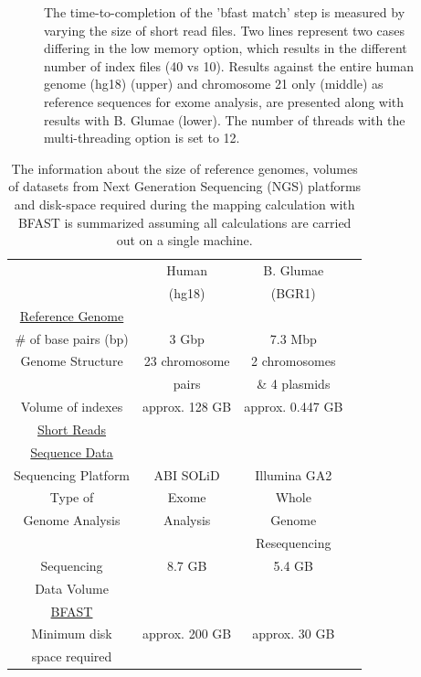 \documentclass{sig-alternate}
\begin{document}
\begin{figure}

\caption{\small The time-to-completion of the 'bfast match' step is
  measured by varying the size of short read files.  Two lines
  represent two cases differing in the low memory option, which
  results in the different number of index files (40 vs 10).  Results against the entire human genome (hg18) (upper) and chromosome 21 only (middle) as reference sequences for exome analysis, are presented along with results with B. Glumae (lower).  The number of threads with the multi-threading option is set to 12.}
  \label{fig:parallel-execution} 
 \end{figure}




\begin{table}
\small
\begin{tabular}{|c|c|c|c|} 
  \hline 
   & Human & B. Glumae   \\ 
& (hg18) & (BGR1)\\   
   
   \hline \hline
 \underline{Reference Genome} & &  \\
    \# of base pairs (bp) &  3 Gbp & 7.3 Mbp \\ \hline
   Genome Structure &   23 chromosome  & 2 chromosomes  \\  
   &   pairs & \& 4 plasmids \\ \hline
    Volume of indexes  & approx. 128 GB  & approx. 0.447 GB  \\ 
      \hline \hline
    \underline{Short Reads} & &   \\
        \underline{Sequence Data}& &    \\
          Sequencing Platform & ABI SOLiD  &  Illumina GA2 \\ \hline
  Type of  &  Exome  & Whole \\ 
  
Genome Analysis  & Analysis &  Genome \\
&& Resequencing \\  \hline

  Sequencing   & 8.7 GB & 5.4 GB \\
  Data Volume&&\\
  
  
  \hline  \hline
  \underline{BFAST} & &  \\
  Minimum disk &  approx. 200 GB   &    approx. 30 GB   \\
space required & &\\
\hline  \hline
\end{tabular} \caption{The information about the size of reference genomes, volumes of datasets from
  Next Generation Sequencing (NGS) platforms and disk-space required during the mapping calculation 
  with BFAST is summarized assuming all calculations are carried out on a single machine.}
 \label{table:two-genomes} 
\end{table}
\end{document}
